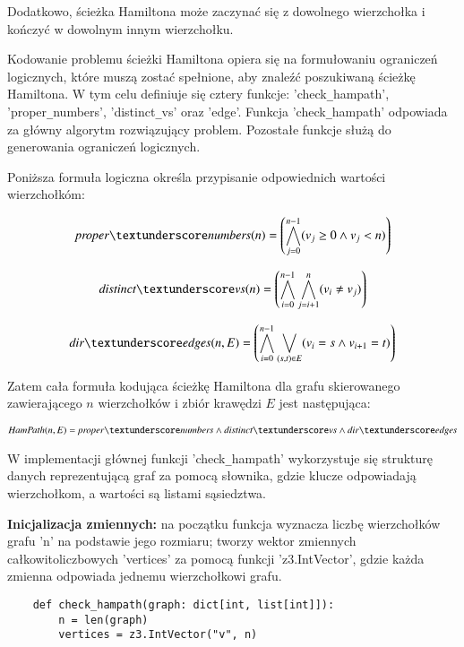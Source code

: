Dodatkowo, ścieżka Hamiltona może zaczynać się z dowolnego wierzchołka i kończyć w dowolnym innym wierzchołku.

Kodowanie problemu ścieżki Hamiltona opiera się na formułowaniu ograniczeń logicznych, które muszą zostać spełnione, aby znaleźć poszukiwaną ścieżkę Hamiltona. W tym celu definiuje się cztery funkcje: 'check\verb|_|hampath', 'proper\verb|_|numbers', 'distinct\verb|_|vs' oraz 'edge'. Funkcja 'check\verb|_|hampath' odpowiada za główny algorytm rozwiązujący problem. Pozostałe funkcje służą do generowania ograniczeń logicznych.

Poniższa formuła logiczna określa przypisanie odpowiednich wartości wierzchołkóm:

\begin{align*}
	\propernumbers(n) = \left( \bigwedge_{j=0}^{n-1} (v_j \geq 0 \land v_j < n) \right) 
\end{align*}


\begin{align*}
	\distinctvs(n) = \left( \bigwedge_{i=0}^{n-1} \bigwedge_{j=i+1}^{n} (v_i \neq v_j) \right)
\end{align*}

\begin{align*}
	\diredges(n, E) = \left( \bigwedge_{i=0}^{n-1} \bigvee_{(s,t) \in E} (v_i = s \land v_{i+1} = t) \right)
\end{align*}

\vspace{1cm}

Zatem cała formuła kodująca ścieżkę Hamiltona dla grafu skierowanego zawierającego \(n\) wierzchołków i zbiór krawędzi \(E\) jest następująca:

\begin{align*}
	\HamPath(n, E) = \propernumbers \land \distinctvs \land \diredges
\end{align*}

W implementacji głównej funkcji 'check\verb|_|hampath' wykorzystuje się strukturę danych reprezentującą graf za pomocą słownika, gdzie klucze odpowiadają wierzchołkom, a wartości są listami sąsiedztwa.

\textbf{Inicjalizacja zmiennych: } na początku funkcja wyznacza liczbę wierzchołków grafu 'n' na podstawie jego rozmiaru; tworzy wektor zmiennych całkowitoliczbowych 'vertices' za pomocą funkcji 'z3.IntVector', gdzie każda zmienna odpowiada jednemu wierzchołkowi grafu.

\begin{lstlisting}	
	def check_hampath(graph: dict[int, list[int]]):
		n = len(graph)
		vertices = z3.IntVector("v", n)
\end{lstlisting}
	
